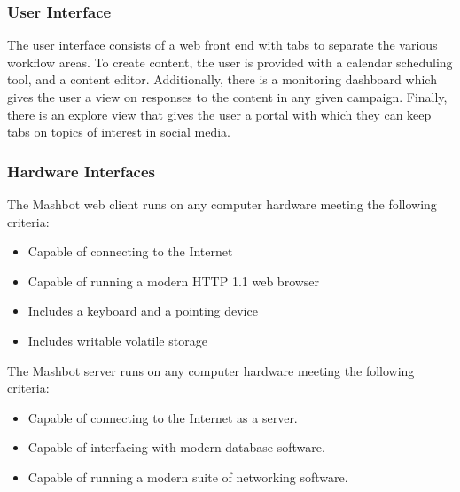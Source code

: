 \documentclass{report}
\begin{document}
		\subsubsection{User Interface} %
                The user interface consists of a web front end
                with tabs to separate the various workflow areas. To
                create content, the user is provided with a calendar
                scheduling tool, and a content editor.  Additionally,
                there is a monitoring dashboard which gives the user a
                view on responses to the content in any given campaign.
                Finally, there is an explore view that gives the user a
                portal with which they can keep tabs on topics of 
                interest in social media.
		\subsubsection{Hardware Interfaces} %
                The Mashbot web client runs on any computer hardware meeting
                the following criteria:
                \begin{itemize}
                  \item Capable of connecting to the Internet
                  \item Capable of running a modern HTTP 1.1 web browser
                  \item Includes a keyboard and a pointing device
                  \item Includes writable volatile storage
                \end{itemize}
                The Mashbot server runs on any computer hardware meeting
                the following criteria:
                \begin{itemize}
                \item Capable of connecting to the Internet as a server.
                \item Capable of interfacing with modern database software.
                \item Capable of running a modern suite of networking software.
		\end{itemize}
\end{document}
